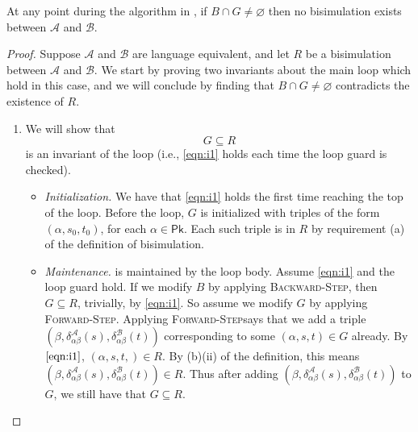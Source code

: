 \documentclass[acmsmall,dvipsnames,nonacm]{acmart}
\newcommand\Pk{\mathsf{Pk}}
\newcommand\pk{\alpha}
\newcommand\pkp{\beta}
\newcommand\Fwd{\textsc{Forward-Step}}
\newcommand\Bkwd{\textsc{Backward-Step}}
\newcommand\A{\mathcal{A}}
\newcommand\B{\mathcal{B}}
\newcommand\delA{\delta^\A_{\pk\pkp}}
\newcommand\delB{\delta^\B_{\pk\pkp}}
\begin{document}
\begin{lemma}\label{lem:bcapg}
At any point during the algorithm in , if $B \cap G \neq \varnothing$ then no bisimulation
exists between $\mathcal{A}$ and $\mathcal{B}$.
\end{lemma}
\begin{proof}
  Suppose $\A$ and $\B$ are language equivalent, and let $R$ be a bisimulation
  between $\A$ and $\B$. We start by proving two invariants about the main
  loop which hold in this case, and we will conclude by finding that $B \cap G
  \neq \varnothing$ contradicts the existence of $R$.
  \begin{enumerate}
    \item We will show that
      \begin{equation}
        \tag{I1}\label{eqn:i1}
        G \subseteq R
      \end{equation}
      is an invariant of the loop (i.e., \ref{eqn:i1} holds each time the loop guard is checked).
      \begin{itemize}
        \item \emph{Initialization.} We have that \ref{eqn:i1} holds the first
          time reaching the top of the loop. Before the loop, $G$ is
          initialized with triples of the form $(\pk, s_0, t_0)$, for each
          $\pk\in\Pk$. Each such triple is in $R$ by requirement (a) of the
          definition of bisimulation.
        \item \emph{Maintenance.}  is maintained by the loop body.
          Assume \ref{eqn:i1} and the loop guard hold. If we modify $B$ by
          applying \Bkwd, then $G\subseteq R$, trivially, by \ref{eqn:i1}. So assume we
          modify $G$ by applying \Fwd. Applying \Fwd says that we add a triple
          $(\pkp,\delA(s),\delB(t))$ corresponding to some $(\pk,s,t)\in G$
          already. By $\ref{eqn:i1}$, $(\pk,s,t,)\in R$. By (b)(ii) of the
          definition, this means $(\pkp,\delA(s),\delB(t)) \in R$. Thus after
          adding $(\pkp, \delA(s), \delB(t))$ to $G$, we still have that
          $G\subseteq R$.
      \end{itemize}


\end{enumerate}
\end{proof}
\end{document}
